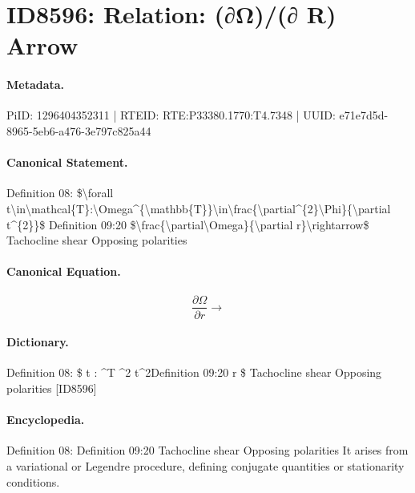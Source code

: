 \section*{ID8596: Relation: (∂Ω)/(∂ R) Arrow}
\paragraph{Metadata.}
PiID: 1296404352311 | RTEID: RTE:P33380.1770:T4.7348 | UUID: e71e7d5d-8965-5eb6-a476-3e797c825a44

\paragraph{Canonical Statement.}
Definition 08: \$\textbackslash{}forall t\textbackslash{}in\textbackslash{}mathcal\{T\}:\textbackslash{}Omega\textasciicircum{}\{\textbackslash{}mathbb\{T\}\}\textbackslash{}in\textbackslash{}frac\{\textbackslash{}partial\textasciicircum{}\{2\}\textbackslash{}Phi\}\{\textbackslash{}partial t\textasciicircum{}\{2\}\}\$ Definition 09:20 \$\textbackslash{}frac\{\textbackslash{}partial\textbackslash{}Omega\}\{\textbackslash{}partial r\}\textbackslash{}rightarrow\$ Tachocline shear Opposing polarities

\paragraph{Canonical Equation.}
\[
\frac{\partial\Omega}{\partial r}\rightarrow
\]

\paragraph{Dictionary.}
Definition 08: \$ t : \textasciicircum{}T \textasciicircum{}2 t\textasciicircum{}2Definition 09:20 r \$ Tachocline shear Opposing polarities [ID8596]

\paragraph{Encyclopedia.}
Definition 08: Definition 09:20 Tachocline shear Opposing polarities It arises from a variational or Legendre procedure, defining conjugate quantities or stationarity conditions.

